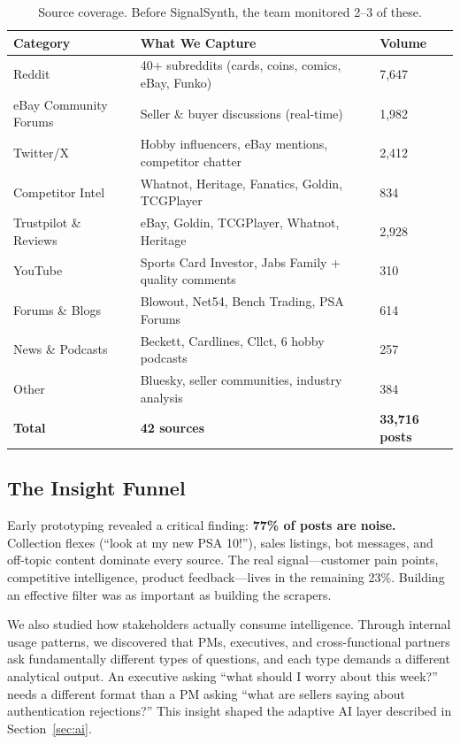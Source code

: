 \documentclass[11pt]{article}
\begin{document}
\begin{table}[h]
\centering
\small
\begin{tabular}{@{}lll@{}}
\toprule
\textbf{Category} & \textbf{What We Capture} & \textbf{Volume} \\
\midrule
Reddit & 40+ subreddits (cards, coins, comics, eBay, Funko) & 7,647 \\
eBay Community Forums & Seller \& buyer discussions (real-time) & 1,982 \\
Twitter/X & Hobby influencers, eBay mentions, competitor chatter & 2,412 \\
Competitor Intel & Whatnot, Heritage, Fanatics, Goldin, TCGPlayer & 834 \\
Trustpilot \& Reviews & eBay, Goldin, TCGPlayer, Whatnot, Heritage & 2,928 \\
YouTube & Sports Card Investor, Jabs Family + quality comments & 310 \\
Forums \& Blogs & Blowout, Net54, Bench Trading, PSA Forums & 614 \\
News \& Podcasts & Beckett, Cardlines, Cllct, 6 hobby podcasts & 257 \\
Other & Bluesky, seller communities, industry analysis & 384 \\
\midrule
\textbf{Total} & \textbf{42 sources} & \textbf{33,716 posts} \\
\bottomrule
\end{tabular}
\caption{Source coverage. Before SignalSynth, the team monitored 2--3 of these.}
\label{tab:sources}
\end{table}

\subsection{The Insight Funnel}
Early prototyping revealed a critical finding: \textbf{77\% of posts are noise.} Collection flexes (``look at my new PSA 10!''), sales listings, bot messages, and off-topic content dominate every source. The real signal---customer pain points, competitive intelligence, product feedback---lives in the remaining 23\%. Building an effective filter was as important as building the scrapers.

We also studied how stakeholders actually consume intelligence. Through internal usage patterns, we discovered that PMs, executives, and cross-functional partners ask fundamentally different types of questions, and each type demands a different analytical output. An executive asking ``what should I worry about this week?'' needs a different format than a PM asking ``what are sellers saying about authentication rejections?'' This insight shaped the adaptive AI layer described in Section~\ref{sec:ai}.
\end{document}
